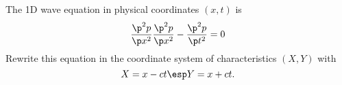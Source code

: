 
\bexo
 The 1D wave equation in physical coordinates $(x,t)$ is 
 \begin{equation}
 	\dfrac{\p^2 p}{\p x^2}\dfrac{\p^2 p}{\p x^2}-\dfrac{\p^2 p}{\p t^2}=0
 \end{equation}
 Rewrite this equation in the coordinate system of characteristics $(X,Y)$ with
  \begin{equation}
  	X=x-ct \esp Y=x+ct.
  \end{equation}
 
\eexo

\solution{
}